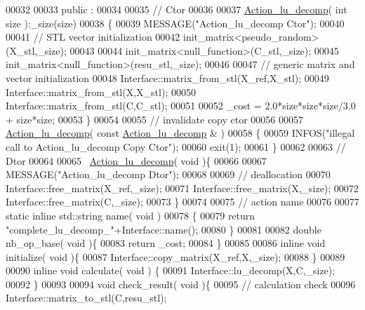 \begin{DoxyCode}
00032 
00033 public :
00034 
00035   \textcolor{comment}{// Ctor}
00036 
00037   \hyperlink{class_action__lu__decomp}{Action\_lu\_decomp}( \textcolor{keywordtype}{int} size ):\_size(size)
00038   \{
00039     MESSAGE(\textcolor{stringliteral}{"Action\_lu\_decomp Ctor"});
00040 
00041     \textcolor{comment}{// STL vector initialization}
00042     init\_matrix<pseudo\_random>(X\_stl,\_size);
00043 
00044     init\_matrix<null\_function>(C\_stl,\_size);
00045     init\_matrix<null\_function>(resu\_stl,\_size);
00046 
00047     \textcolor{comment}{// generic matrix and vector initialization}
00048     Interface::matrix\_from\_stl(X\_ref,X\_stl);
00049     Interface::matrix\_from\_stl(X,X\_stl);
00050     Interface::matrix\_from\_stl(C,C\_stl);
00051 
00052     \_cost = 2.0*size*size*size/3.0 + size*size;
00053   \}
00054 
00055   \textcolor{comment}{// invalidate copy ctor}
00056 
00057   \hyperlink{class_action__lu__decomp}{Action\_lu\_decomp}( \textcolor{keyword}{const}  \hyperlink{class_action__lu__decomp}{Action\_lu\_decomp} & )
00058   \{
00059     INFOS(\textcolor{stringliteral}{"illegal call to Action\_lu\_decomp Copy Ctor"});
00060     exit(1);
00061   \}
00062 
00063   \textcolor{comment}{// Dtor}
00064 
00065   ~\hyperlink{class_action__lu__decomp}{Action\_lu\_decomp}( \textcolor{keywordtype}{void} )\{
00066 
00067     MESSAGE(\textcolor{stringliteral}{"Action\_lu\_decomp Dtor"});
00068 
00069     \textcolor{comment}{// deallocation}
00070     Interface::free\_matrix(X\_ref,\_size);
00071     Interface::free\_matrix(X,\_size);
00072     Interface::free\_matrix(C,\_size);
00073   \}
00074 
00075   \textcolor{comment}{// action name}
00076 
00077   \textcolor{keyword}{static} \textcolor{keyword}{inline} std::string name( \textcolor{keywordtype}{void} )
00078   \{
00079     \textcolor{keywordflow}{return} \textcolor{stringliteral}{"complete\_lu\_decomp\_"}+Interface::name();
00080   \}
00081 
00082   \textcolor{keywordtype}{double} nb\_op\_base( \textcolor{keywordtype}{void} )\{
00083     \textcolor{keywordflow}{return} \_cost;
00084   \}
00085 
00086   \textcolor{keyword}{inline} \textcolor{keywordtype}{void} initialize( \textcolor{keywordtype}{void} )\{
00087     Interface::copy\_matrix(X\_ref,X,\_size);
00088   \}
00089 
00090   \textcolor{keyword}{inline} \textcolor{keywordtype}{void} calculate( \textcolor{keywordtype}{void} ) \{
00091       Interface::lu\_decomp(X,C,\_size);
00092   \}
00093 
00094   \textcolor{keywordtype}{void} check\_result( \textcolor{keywordtype}{void} )\{
00095     \textcolor{comment}{// calculation check}
00096     Interface::matrix\_to\_stl(C,resu\_stl);

\end{DoxyCode}
